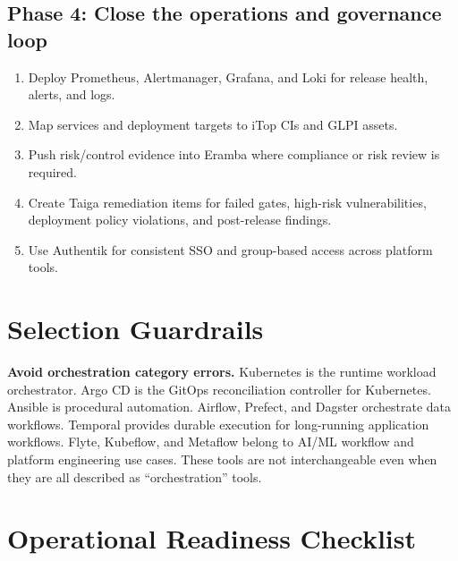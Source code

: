 \documentclass[10pt,letterpaper]{article}
\begin{document}
\subsection{Phase 4: Close the operations and governance loop}
\begin{enumerate}
  \item Deploy Prometheus, Alertmanager, Grafana, and Loki for release health, alerts, and logs.
  \item Map services and deployment targets to iTop CIs and GLPI assets.
  \item Push risk/control evidence into Eramba where compliance or risk review is required.
  \item Create Taiga remediation items for failed gates, high-risk vulnerabilities, deployment policy violations, and post-release findings.
  \item Use Authentik for consistent SSO and group-based access across platform tools.
\end{enumerate}

\section{Selection Guardrails}

\begin{cautionbox}
\textbf{Avoid orchestration category errors.} Kubernetes is the runtime workload orchestrator. Argo CD is the GitOps reconciliation controller for Kubernetes. Ansible is procedural automation. Airflow, Prefect, and Dagster orchestrate data workflows. Temporal provides durable execution for long-running application workflows. Flyte, Kubeflow, and Metaflow belong to AI/ML workflow and platform engineering use cases. These tools are not interchangeable even when they are all described as ``orchestration'' tools.\cite{KubernetesOverview,ArgoCDHome,AnsiblePlaybooks,AirflowHome,TemporalWhatIs,KubeflowIntro}
\end{cautionbox}

\section{Operational Readiness Checklist}
\end{document}
